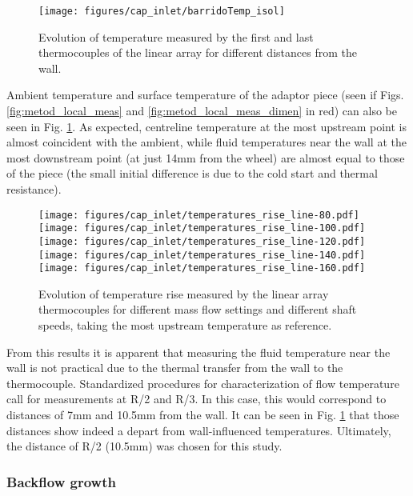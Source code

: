 \begin{figure}[tb!]
\centering
\texttt{[image: figures/cap\_inlet/barridoTemp\_isol]}
\caption{Evolution of temperature measured by the first and last thermocouples of the linear array for different distances from the wall.}
\label{fig:barrido_temp}
\end{figure}

Ambient temperature and surface temperature of the adaptor piece (seen if Figs. \ref{fig:metod_local_meas} and \ref{fig:metod_local_meas_dimen} in red) can also be seen in Fig. \ref{fig:barrido_temp}. As expected, centreline temperature at the most upstream point is almost coincident with the ambient, while fluid temperatures near the wall at the most downstream point (at just 14mm from the wheel) are almost equal to those of the piece (the small initial difference is due to the cold start and thermal resistance).

\begin{figure}[htb!]%
\centering
\texttt{[image: figures/cap\_inlet/temperatures\_rise\_line-80.pdf]}
\texttt{[image: figures/cap\_inlet/temperatures\_rise\_line-100.pdf]}
\texttt{[image: figures/cap\_inlet/temperatures\_rise\_line-120.pdf]}
\texttt{[image: figures/cap\_inlet/temperatures\_rise\_line-140.pdf]}
\texttt{[image: figures/cap\_inlet/temperatures\_rise\_line-160.pdf]}
\caption{Evolution of temperature rise measured by the linear array thermocouples for different mass flow settings and different shaft speeds, taking the most upstream temperature as reference.}
\label{fig:temp_line_linear}
\end{figure}

From this results it is apparent that measuring the fluid temperature near the wall is not practical due to the thermal transfer from the wall to the thermocouple. Standardized procedures for characterization of flow temperature call for measurements at R/2 and R/3. In this case, this would correspond to distances of 7mm and 10.5mm from the wall. It can be seen in Fig. \ref{fig:barrido_temp} that those distances show indeed a depart from wall-influenced temperatures. Ultimately, the distance of R/2 (10.5mm) was chosen for this study.

\subsubsection{Backflow growth}

